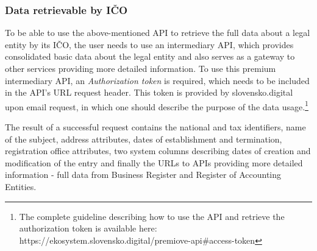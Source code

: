 \documentclass[thesis=B,english]{sprlajur-slovakopendata}[2018/05/12]
\begin{document}
\subsubsection{Data retrievable by IČO}
To be able to use the above-mentioned API to retrieve the full data about a legal entity by its IČO, the user needs to use an intermediary API, which provides consolidated basic data about the legal entity and also serves as a gateway to other services providing more detailed information. To use this premium intermediary API, an \textit{Authorization token} is required, which needs to be included in the API's URL request header. This token is provided by slovensko.digital upon email request, in which one should describe the purpose of the data usage.\footnote{ The complete guideline describing how to use the API and retrieve the authorization token is available here: https://ekosystem.slovensko.digital/premiove-api\#access-token} 
	
The result of a successful request contains the national and tax identifiers, name of the subject, address attributes, dates of establishment and termination, registration office attributes, two system columns describing dates of creation and modification of the entry and finally the URLs to APIs providing more detailed information - full data from Business Register and Register of Accounting Entities. 
	
\end{document}
